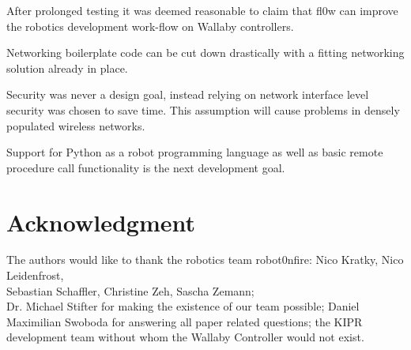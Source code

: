 \documentclass[conference]{IEEEtran}
\begin{document}
After prolonged testing it was deemed reasonable to claim that fl0w can improve the robotics development work-flow on Wallaby controllers. 

Networking boilerplate code can be cut down drastically with a fitting networking solution already in place.

Security was never a design goal, instead relying on network interface level security was chosen to save time. This assumption will cause problems in densely populated wireless networks. 

Support for Python as a robot programming language as well as basic remote procedure call functionality is the next development goal.

\section*{Acknowledgment}
The authors would like to thank the robotics team robot0nfire: Nico Kratky, Nico Leidenfrost,\\ Sebastian Schaffler, Christine Zeh, Sascha Zemann;\\ Dr. Michael Stifter for making the existence of our team possible; Daniel Maximilian Swoboda for answering all paper related questions; the KIPR development team without whom the Wallaby Controller would not exist.
\end{document}
